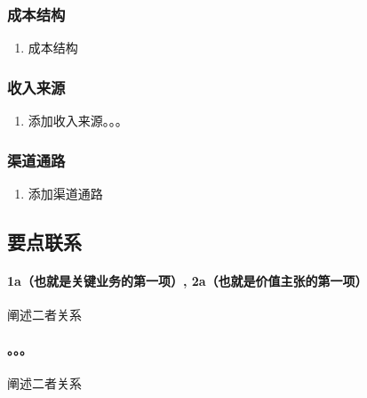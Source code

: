 \documentclass[a4paper]{ctexart}
\begin{document}
\subsubsection{成本结构}

\begin{enumerate}[label=\alph*.]
  \item 成本结构
\end{enumerate}

\subsubsection{收入来源}

\begin{enumerate}[label=\alph*.]
  \item 添加收入来源。。。
\end{enumerate}

\subsubsection{渠道通路}

\begin{enumerate}[label=\alph*.]
  \item 添加渠道通路
\end{enumerate}


\subsection{要点联系}

\paragraph{1a（也就是关键业务的第一项）, 2a（也就是价值主张的第一项）}阐述二者关系
\paragraph{。。。}阐述二者关系
\end{document}
